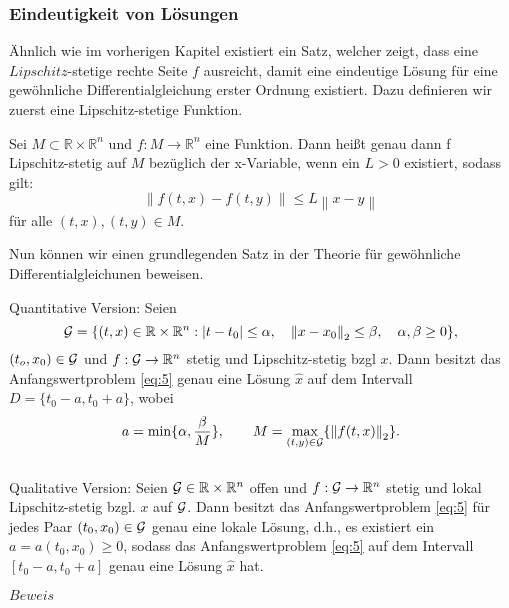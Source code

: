 \subsubsection{Eindeutigkeit von Lösungen}
Ähnlich wie im vorherigen Kapitel existiert ein Satz, welcher zeigt, dass eine $Lipschitz$-stetige
rechte Seite $f$ ausreicht, damit eine eindeutige Lösung für eine
gewöhnliche Differentialgleichung erster Ordnung existiert. Dazu definieren wir zuerst eine Lipschitz-stetige Funktion.
\begin{definition}
    Sei $M \subset \mathbb{R} \times \mathbb{R}^{n}$ und $f: M \rightarrow \mathbb{R}^n$ eine Funktion. Dann heißt genau
    dann f Lipschitz-stetig auf $M$ bezüglich der x-Variable, wenn ein $L>0$ existiert, sodass gilt:
    \[
        \left\lVert f(t,x) - f(t,y) \right\rVert \leq L \left\lVert x - y  \right\rVert
    \]
    für alle $(t,x), (t,y) \in M$.
\end{definition}
Nun können wir einen grundlegenden Satz in der Theorie für gewöhnliche Differentialgleichunen beweisen.
\begin{satz}
Quantitative Version: Seien
\[
        {\cal G}=\{(t,x) \in \mathbb{R} \times \mathbb{R}^{n}: |t-t_{0}| \leq \alpha, \quad
    \left\lVert x-x_{0} \right\rVert _{2} \leq\beta, \quad \alpha,\beta \geq 0 \},
\]
$(t_{o},x_{0})\in {\cal G}$ und $f:{\cal G} \rightarrow \mathbb{R}^{n}$ stetig und Lipschitz-stetig bzgl $x$.
Dann besitzt das Anfangswertproblem \eqref{eq:5} genau eine Lösung $\hat{x}$ auf dem Intervall
$D=\{t_{0}-a,t_{0}+a\}$, wobei
\[
    a=\min\{\alpha, \frac{\beta}{M}\}, \qquad M= \max_{(t,y)\in {\cal G}}\{\left\lVert f(t,x)\right\rVert_{2} \}
    .
\]\\
Qualitative Version: Seien ${\cal G}\in \mathbb{R} \times \mathbb{R}^{n}$ offen und $f:{\cal G} \rightarrow \mathbb{R}^{n}$ stetig und lokal
Lipschitz-stetig bzgl. $x$ auf $\cal{G}$. Dann besitzt das Anfangswertproblem \eqref{eq:5} für jedes Paar
$(t_{0},x_{0}) \in {\cal G}$ genau eine lokale Lösung, d.h., es existiert ein $a=a(t_{0},x_{0}) \geq 0$, sodass
das Anfangswertproblem \eqref{eq:5} auf dem Intervall $[t_{0}-a,t_{0}+a]$ genau eine Lösung $\hat{x}$ hat.
\end{satz}
$Beweis$ \cite[56-58]{beckGewohnlicheDifferentialgleichungen2018}

